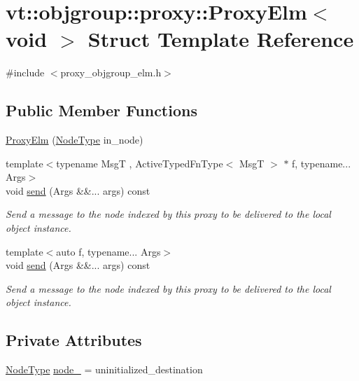 \hypertarget{structvt_1_1objgroup_1_1proxy_1_1_proxy_elm_3_01void_01_4}{}\section{vt\+:\+:objgroup\+:\+:proxy\+:\+:Proxy\+Elm$<$ void $>$ Struct Template Reference}
\label{structvt_1_1objgroup_1_1proxy_1_1_proxy_elm_3_01void_01_4}


{\ttfamily \#include $<$proxy\+\_\+objgroup\+\_\+elm.\+h$>$}

\subsection*{Public Member Functions}
\begin{DoxyCompactItemize}
\item 
\hyperlink{structvt_1_1objgroup_1_1proxy_1_1_proxy_elm_3_01void_01_4_ac0574a043c575dafda3686ff9099a4f1}{Proxy\+Elm} (\hyperlink{namespacevt_a866da9d0efc19c0a1ce79e9e492f47e2}{Node\+Type} in\+\_\+node)
\item 
{\footnotesize template$<$typename MsgT , Active\+Typed\+Fn\+Type$<$ Msg\+T $>$ $\ast$ f, typename... Args$>$ }\\void \hyperlink{structvt_1_1objgroup_1_1proxy_1_1_proxy_elm_3_01void_01_4_a823b06cf35e500b7a14f2eadb38c9e6d}{send} (Args \&\&... args) const
\begin{DoxyCompactList}\small\item\em Send a message to the node indexed by this proxy to be delivered to the local object instance. \end{DoxyCompactList}\item 
{\footnotesize template$<$auto f, typename... Args$>$ }\\void \hyperlink{structvt_1_1objgroup_1_1proxy_1_1_proxy_elm_3_01void_01_4_ad2ef80eda4f8671590ae692a0995e6ce}{send} (Args \&\&... args) const
\begin{DoxyCompactList}\small\item\em Send a message to the node indexed by this proxy to be delivered to the local object instance. \end{DoxyCompactList}\end{DoxyCompactItemize}
\subsection*{Private Attributes}
\begin{DoxyCompactItemize}
\item 
\hyperlink{namespacevt_a866da9d0efc19c0a1ce79e9e492f47e2}{Node\+Type} \hyperlink{structvt_1_1objgroup_1_1proxy_1_1_proxy_elm_3_01void_01_4_aa09e3bed73c03d683858969775d5d043}{node\+\_\+} = uninitialized\+\_\+destination
\end{DoxyCompactItemize}


